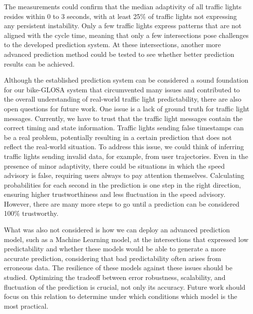 The measurements could confirm that the median adaptivity of all traffic lights resides within 0 to 3 seconds, with at least 25\% of traffic lights not expressing any persistent instability. Only a few traffic lights express patterns that are not aligned with the cycle time, meaning that only a few intersections pose challenges to the developed prediction system. At these intersections, another more advanced prediction method could be tested to see whether better prediction results can be achieved.

Although the established prediction system can be considered a sound foundation for our bike-GLOSA system that circumvented many issues and contributed to the overall understanding of real-world traffic light predictability, there are also open questions for future work. One issue is a lack of ground truth for traffic light messages. Currently, we have to trust that the traffic light messages contain the correct timing and state information. Traffic lights sending false timestamps can be a real problem, potentially resulting in a certain prediction that does not reflect the real-world situation. To address this issue, we could think of inferring traffic lights sending invalid data, for example, from user trajectories. Even in the presence of minor adaptivity, there could be situations in which the speed advisory is false, requiring users always to pay attention themselves. Calculating probabilities for each second in the prediction is one step in the right direction, ensuring higher trustworthiness and less fluctuation in the speed advisory. However, there are many more steps to go until a prediction can be considered 100\% trustworthy.

What was also not considered is how we can deploy an advanced prediction model, such as a Machine Learning model, at the intersections that expressed low predictability and whether these models would be able to generate a more accurate prediction, considering that bad predictability often arises from erroneous data. The resilience of these models against these issues should be studied. Optimizing the tradeoff between error robustness, scalability, and fluctuation of the prediction is crucial, not only its accuracy. Future work should focus on this relation to determine under which conditions which model is the most practical.
